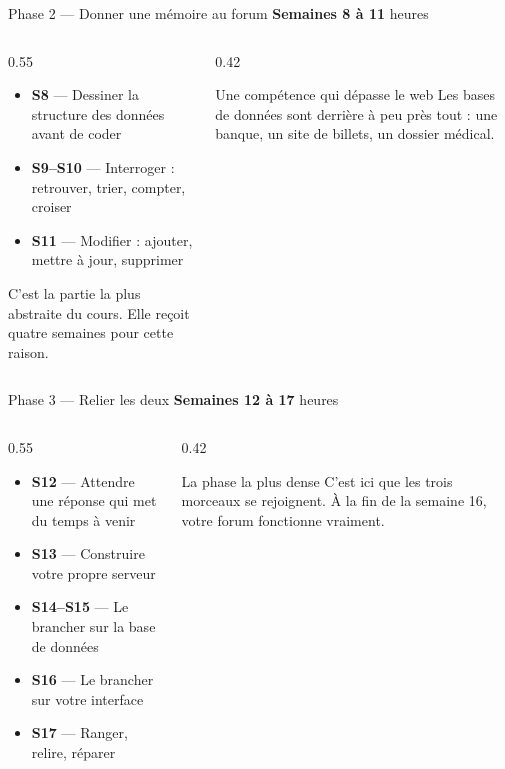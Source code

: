 \documentclass[aspectratio=169,11pt]{beamer}
\begin{document}
\begin{frame}{Phase 2 --- Donner une mémoire au forum}
  \textbf{Semaines 8 à 11} \quad\textcolor{cfptDarkGrey}{\textbar} heures
  \medskip

  \begin{columns}[T]
    \begin{column}{0.55\textwidth}
      \begin{itemize}
        \item \textbf{S8} --- Dessiner la structure des données avant de coder
        \item \textbf{S9--S10} --- Interroger : retrouver, trier, compter, croiser
        \item \textbf{S11} --- Modifier : ajouter, mettre à jour, supprimer
      \end{itemize}
      \medskip
      C'est la partie la plus abstraite du cours. Elle reçoit quatre semaines pour cette raison.
    \end{column}
    \begin{column}{0.42\textwidth}
      \begin{block}{Une compétence qui dépasse le web}
        Les bases de données sont derrière à peu près tout : une banque, un site de billets, un dossier médical.
      \end{block}
    \end{column}
  \end{columns}
\end{frame}

\begin{frame}{Phase 3 --- Relier les deux}
  \textbf{Semaines 12 à 17} \quad\textcolor{cfptDarkGrey}{\textbar} heures
  \medskip

  \begin{columns}[T]
    \begin{column}{0.55\textwidth}
      \begin{itemize}
        \item \textbf{S12} --- Attendre une réponse qui met du temps à venir
        \item \textbf{S13} --- Construire votre propre serveur
        \item \textbf{S14--S15} --- Le brancher sur la base de données
        \item \textbf{S16} --- Le brancher sur votre interface
        \item \textbf{S17} --- Ranger, relire, réparer
      \end{itemize}
    \end{column}
    \begin{column}{0.42\textwidth}
      \begin{block}{La phase la plus dense}
        C'est ici que les trois morceaux se rejoignent. À la fin de la semaine 16, votre forum fonctionne vraiment.
      \end{block}
    \end{column}
  \end{columns}
\end{frame}
\end{document}
